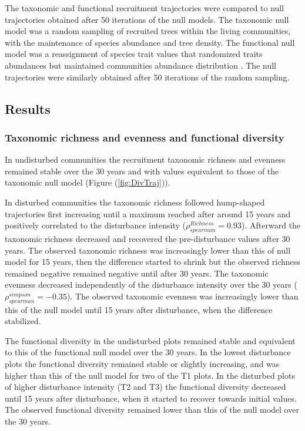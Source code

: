 \documentclass[
  11pt,
  french,
  A4paper,
  extrafontsizes,onecolumn,openright
  ]{memoir}
\begin{document}
The taxonomic and functional recruitment trajectories were compared to
null trajectories obtained after 50 iterations of the null models. The
taxonomic null model was a random sampling of recruited trees within the
living communities, with the maintenance of species abundance and tree
density. The functional null model was a reassignment of species trait
values that randomized traits abundances but maintained communities
abundance distribution \autocite{Mason2013}. The null trajectories were
similarly obtained after 50 iterations of the random sampling.

\subsection{Results}\label{results-2}

\subsubsection{Taxonomic richness and evenness and functional
diversity}\label{taxonomic-richness-and-evenness-and-functional-diversity}

In undisturbed communities the recruitment taxonomic richness and
evenness remained stable over the 30 years and with values equivalent to
those of the taxonomic null model (Figure (\ref{fig:DivTraj})).

In disturbed communities the taxonomic richness followed hump-shaped
trajectories first increasing until a maximum reached after around 15
years and positively correlated to the disturbance intensity
(\(\rho^{Richness}_{spearman}=0.93\)). Afterward the taxonomic richness
decreased and recovered the pre-disturbance values after 30 years. The
observed taxonomic richness was increasingly lower than this of null
model for 15 years, then the difference started to shrink but the
observed richness remained negative remained negative until after 30
years. The taxonomic evenness decreased independently of the disturbance
intensity over the 30 years (\(\rho^{simpson}_{spearman}=-0.35\)). The
observed taxonomic evenness was increasingly lower than this of the null
model until 15 years after disturbance, when the difference stabilized.

The functional diversity in the undisturbed plots remained stable and
equivalent to this of the functional null model over the 30 years. In
the lowest disturbance plots the functional diversity remained stable or
slightly increasing, and was higher than this of the null model for two
of the T1 plots. In the disturbed plots of higher disturbance intensity
(T2 and T3) the functional diversity decreased until 15 years after
disturbance, when it started to recover towards initial values. The
observed functional diversity remained lower than this of the null model
over the 30 years.
\end{document}
